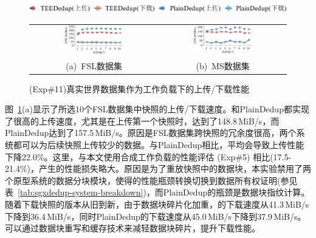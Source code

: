 \begin{figure}[!htb]
  \centering
  \includegraphics[height=11pt]{pic/sgxdedup/plot/exp_b2/expb2_trace_legend.pdf}
  \begin{tabular}{@{\ }c@{\ }c}
    \includegraphics[width=0.49\textwidth]{pic/sgxdedup/plot/exp_b2/expb2_trace_fsl_plain_sgx.pdf} & 
    \includegraphics[width=0.49\textwidth]{pic/sgxdedup/plot/exp_b2/expb2_trace_ms_plain_sgx.pdf}     \\
    \mbox{\small (a) FSL数据集}                                                                    & 
    \mbox{\small (b) MS数据集}
  \end{tabular}
  \caption{(Exp\#11)真实世界数据集作为工作负载下的上传/下载性能}
  \label{fig:sgxdedup-tracePerformance}
\end{figure}

图~\ref{fig:sgxdedup-tracePerformance}(a)显示了所选10个FSL数据集中快照的上传/下载速度。\sysnameS 和PlainDedup都实现了很高的上传速度，尤其是在上传第一个快照时，\sysnameS 达到了148.8\,MiB/s，而PlainDedup达到了157.5\,MiB/s。原因是FSL数据集跨快照的冗余度很高，两个系统都可以为后续快照上传较少的数据。与PlainDedup相比，\sysnameS 平均会导致上传性能下降22.0\%。这里，与本文使用合成工作负载的性能评估 (Exp\#5) 相比(17.5-21.4\%)，产生的性能损失略大。原因是为了重放快照中的数据块，本实验禁用了两个原型系统的数据分块模块，使得\sysnameS 的性能瓶颈转换切换到数据所有权证明(参见表~\ref{tab:sgxdedup-system-breakdown})，而PlainDedup的瓶颈是数据块指纹计算。随着下载快照的版本从旧到新，由于数据块碎片化加重，\sysnameS 的下载速度从41.3\,MiB/s下降到36.4\,MiB/s，同时PlainDedup的下载速度从45.0\,MiB/s下降到37.9\,MiB/s。\sysnameS 可以通过数据块重写和缓存技术来减轻数据块碎片，提升下载性能。

